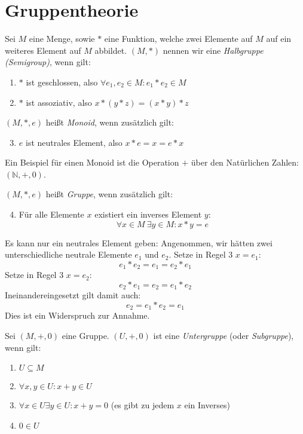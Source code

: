 \chapter{Gruppentheorie}

Sei $M$ eine Menge, sowie $*$ eine Funktion, welche zwei Elemente auf $M$ auf ein weiteres Element auf $M$ abbildet. $(M,*)$ nennen wir eine {\em Halbgruppe (Semigroup)}, wenn gilt:
\begin{enumerate}
  \item $*$ ist geschlossen, also $\forall e_1, e_2 \in M: e_1 * e_2 \in M$
  \item $*$ ist assoziativ, also $x*(y*z)=(x*y)*z$
\end{enumerate}

$(M,*,e)$ heißt {\em Monoid}, wenn zusätzlich gilt:

\begin{enumerate}
\setcounter{enumi}{2}
  \item $e$ ist neutrales Element, also $x*e = x = e*x$
\end{enumerate}

Ein Beispiel für einen Monoid ist die Operation $+$ über den Natürlichen Zahlen: $(\mathbb{N},+,0)$.

$(M,*,e)$ heißt {\em Gruppe}, wenn zusätzlich gilt:

\begin{enumerate}
\setcounter{enumi}{3}
  \item Für alle Elemente $x$ existiert ein inverses Element $y$:
  $$\forall x \in M\ \exists y \in M: x*y=e$$
\end{enumerate}


Es kann nur ein neutrales Element geben: Angenommen, wir hätten zwei unterschiedliche neutrale Elemente $e_1$ und $e_2$. Setze in Regel 3 $x=e_1$:
$$ e_1 * e_2 = e_1 = e_2 * e_1 $$
Setze in Regel 3 $x=e_2$:
$$ e_2 * e_1 = e_2 = e_1 * e_2 $$
Ineinandereingesetzt gilt damit auch:
$$ e_2 = e_1 * e_2 = e_1 $$
Dies ist ein Widerspruch zur Annahme.


Sei $(M,+,0)$ eine Gruppe. $(U,+,0)$ ist eine {\em Untergruppe} (oder {\em Subgruppe}), wenn gilt:
\begin{enumerate}
  \item $U \subseteq M$
  \item $\forall x,y \in U: x+y \in U$
  \item $\forall x \in U \exists y \in U: x+y=0$ (es gibt zu jedem $x$ ein Inverses)
  \item $0 \in U$
\end{enumerate}

